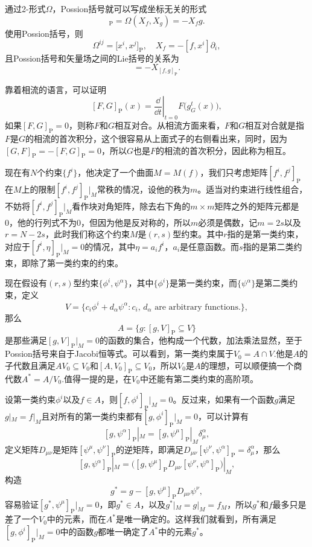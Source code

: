 通过2-形式$\Omega$，Possion括号就可以写成坐标无关的形式
\begin{equation}
	[f,g]_{\mathrm{P}}=\Omega(X_f,X_g)=-X_fg.
	\label{s2:2}
\end{equation}
使用Possion括号，则
\[
	\Omega^{ij}=\bigl[x^i,x^j\bigr]_{\mathrm{P}},\quad X_f=-[f,x^i]\partial_i,
\]
且Possion括号和矢量场之间的Lie括号的关系为
\begin{equation}
	[X_f,X_g]=-X_{[f,g]_{\mathrm{P}}}.
\end{equation}

靠着相流的语言，可以证明
\[
	[F,G]_{\mathrm{P}}(x)=\left.\frac{\dd }{\dd t}\right|_{t=0}F\bigl(g_G^t(x)\bigr),
\]
如果$[F,G]_{\mathrm{P}}=0$，则称$F$和$G$相互对合。从相流方面来看，$F$和$G$相互对合就是指$F$是$G$的相流的首次积分，这个很容易从上面式子的右侧看出来，同时，因为$[G,F]_{\mathrm{P}}=-[F,G]_{\mathrm{P}}=0$，所以$G$也是$F$的相流的首次积分，因此称为相互。


现在有$N$个约束$\{f^i\}$，他决定了一个曲面$M=M(f)$，我们只考虑矩阵$[f^i,f^j]_{\mathrm{P}}$在$M$上的限制$[f^i,f^j]_{\mathrm{P}}|_M$常秩的情况，设他的秩为$m$。适当对约束进行线性组合，不妨将$[f^i,f^j]_{\mathrm{P}}|_M$看作块对角矩阵，除去右下角的$m\times m$矩阵之外的矩阵元都是0，他的行列式不为0，但因为他是反对称的，所以$m$必须是偶数，记$m=2s$以及$r=N-2s$，此时我们称这个约束$M$是$(r,s)$型约束。其中$r$指的是第一类约束，对应于$[f^i,\eta]_{\mathrm{P}}|_M=0$的情况，其中$\eta=a_if^i$，$a_i$是任意函数。而$s$指的是第二类约束，即除了第一类约束的约束。

现在假设有$(r,s)$型约束$\{\phi^i,\psi^\alpha\}$，其中$\{\phi^i\}$是第一类约束，而$\{\psi^\alpha\}$是第二类约束，定义
\[
	V=\bigl\{c_i\phi^i+d_\alpha \psi^\alpha: c_i,\,d_\alpha\text{ are arbitrary functions.}\bigr\},
\]
那么
\[
	A=\bigl\{g: [g,V]_{\mathrm{P}}\subseteq V\bigr\}
\]
是那些满足$[g,V]_{\mathrm{P}}|_M=0$的函数的集合，他构成一个代数，加法乘法显然，至于Possion括号来自于Jacobi恒等式。可以看到，第一类约束属于$V_0=A\cap V$.他是$A$的子代数且满足$AV_0\subseteq V_0$和$[A,V_0]_{\mathrm{P}}\subseteq V_0$，所以$V_0$是$A$的理想，可以顺便搞一个商代数$A^*=A/V_0$.值得一提的是，在$V_0$中还能有第二类约束的高阶项。

设第一类约束$\phi^i$以及$f\in A$，则$[f,\phi^i]_{\mathrm{P}}|_M=0$。反过来，如果有一个函数$g$满足$g|_M=f|_M$且对所有的第一类约束都有$[g,\phi^i]_{\mathrm{P}}|_M=0$，可以计算有
\[
	[g,\psi^\alpha]_{\mathrm{P}}|_M=[g,\psi^\mu]_{\mathrm{P}}|_M\delta^{\alpha}_{\mu},
\]
定义矩阵$D_{\mu\nu}$是矩阵$[\psi^\mu,\psi^\nu]_{\mathrm{P}}$的逆矩阵，即满足$D_{\mu\nu}[\psi^\nu,\psi^\alpha]_{\mathrm{P}}=\delta_{\mu}^{\alpha}$，那么
\[
	[g,\psi^\alpha]_{\mathrm{P}}|_M=\bigl([g,\psi^\mu]_{\mathrm{P}}D_{\mu\nu}[\psi^\nu,\psi^\alpha]_{\mathrm{P}}\bigr)|_M,
\]
构造
\[
	g^*=g-[g,\psi^\mu]_{\mathrm{P}}D_{\mu\nu}\psi^\nu,
\]
容易验证$[g^*,\psi^\mu]_{\mathrm{P}}|_M=0$，即$g^*\in A$，以及$g^*|_M=g|_M=f_M$，所以$g^*$和$f$最多只是差了一个$V_0$中的元素，而在$A^*$是唯一确定的。这样我们就看到，所有满足$[g,\phi^i]_{\mathrm{P}}|_M=0$中的函数$g$都唯一确定了$A^*$中的元素$g^*$。

